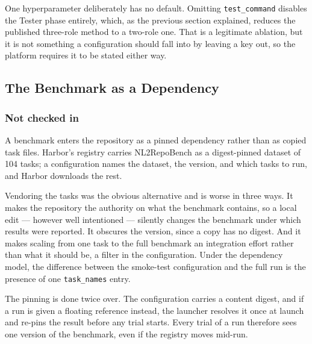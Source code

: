 One hyperparameter deliberately has no default. Omitting \texttt{test\_command}
disables the Tester phase entirely, which, as the previous section explained,
reduces the published three-role method to a two-role one. That is a legitimate
ablation, but it is not something a configuration should fall into by leaving a
key out, so the platform requires it to be stated either way.


\subsection{The Benchmark as a Dependency}

\subsubsection{Not checked in}

A benchmark enters the repository as a pinned dependency rather than as copied
task files. Harbor's registry carries NL2RepoBench as a digest-pinned dataset
of 104 tasks; a configuration names the dataset, the version, and which tasks
to run, and Harbor downloads the rest.

Vendoring the tasks was the obvious alternative and is worse in three ways. It
makes the repository the authority on what the benchmark contains, so a local
edit --- however well intentioned --- silently changes the benchmark under
which results were reported. It obscures the version, since a copy has no
digest. And it makes scaling from one task to the full benchmark an integration
effort rather than what it should be, a filter in the configuration. Under the
dependency model, the difference between the smoke-test configuration and the
full run is the presence of one \texttt{task\_names} entry.

The pinning is done twice over. The configuration carries a content digest,
and if a run is given a floating reference instead, the launcher resolves it
once at launch and re-pins the result before any trial starts. Every trial of a
run therefore sees one version of the benchmark, even if the registry moves
mid-run.

